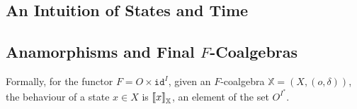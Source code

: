 %
%
%
\subsection{An Intuition of States and Time}
\subsection{Anamorphisms and Final $F$-Coalgebras}
Formally, for the functor $F=O\times \texttt{id}^I$, given an $F$-coalgebra $\mathbb{X}=(X,(o,\delta))$, the behaviour of a state $x\in X$ is ${{\llbracket x\rrbracket}}_{\mathbb{X}}$, an element of the set $O^{I^*}$. 
